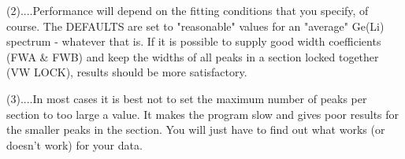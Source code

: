    (2)....Performance  will depend on the fitting conditions that you specify,
          of course. The DEFAULTS  are  set  to  "reasonable"  values  for  an
          "average"  Ge(Li)  spectrum - whatever that is. If it is possible to
          supply good width coefficients (FWA & FWB) and keep  the  widths  of
          all  peaks in a section locked together (VW LOCK), results should be
          more satisfactory.
 
   (3)....In most cases it is best not to set the maximum number of peaks  per
          section  to  too  large a value. It makes the program slow and gives
          poor results for the smaller peaks in the  section.  You  will  just
          have to find out what works (or doesn't work) for your data.

